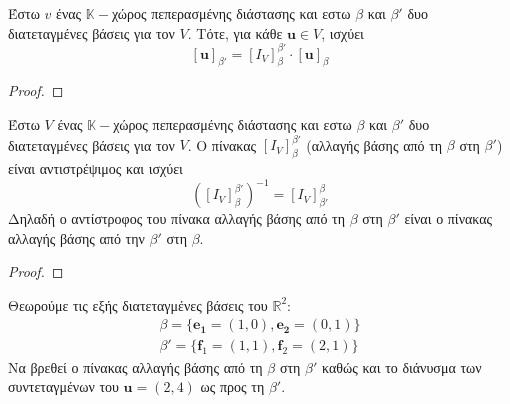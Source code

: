 \begin{thm}\label{thm:3}
  Έστω $v$ ένας $ \mathbb{K}- $χώρος πεπερασμένης διάστασης και εστω $\beta$ και 
  $\beta '$ δυο διατεταγμένες βάσεις για τον $V$. Τότε, για κάθε $ \mathbf{u} \in V $, 
  ισχύει 
  \[
    [\mathbf{u}]_{\beta '} = [I_{V}]_{\beta }^{\beta '} \cdot [\mathbf{u}]_{\beta }
  \] 
\end{thm}

\begin{proof}
\end{proof}

\begin{thm}\label{thm:4}
  Έστω $V$ ένας $ \mathbb{K}- $χώρος πεπερασμένης διάστασης και εστω $\beta$ και 
  $\beta '$ δυο διατεταγμένες βάσεις για τον $V$. Ο πίνακας $ [I_{V}]_{\beta }^{\beta '}
  $ (αλλαγής βάσης από τη $\beta$ στη $\beta '$) είναι αντιστρέψιμος και ισχύει 
  \[
    \left({[I_{V}]_{\beta }^{\beta '}}\right)^{-1} = [I_{V}]_{\beta '}^{\beta}  
  \] 
  Δηλαδή ο αντίστροφος του πίνακα αλλαγής βάσης από τη $\beta$ στη $\beta '$ είναι 
  ο πίνακας αλλαγής βάσης από την $\beta '$ στη $\beta$.
\end{thm}

\begin{proof}

\end{proof}

\begin{example}
  Θεωρούμε τις εξής διατεταγμένες βάσεις του $ \mathbb{R}^{2} $:
  \begin{align*}
    \beta = \{ \mathbf{e_{1}}= (1,0), \mathbf{e_{2}}= (0,1) \} \\
    \beta ' = \{ \mathbf{f}_{1} = (1,1), \mathbf{f} _{2} = (2,1) \} 
  \end{align*}
  Να βρεθεί ο πίνακας αλλαγής βάσης από τη $ \beta $ στη $ \beta' $ καθώς και το 
  διάνυσμα των συντεταγμένων του $ \mathbf{u} = (2,4) $ ως προς τη $\beta '$.
\end{example}

